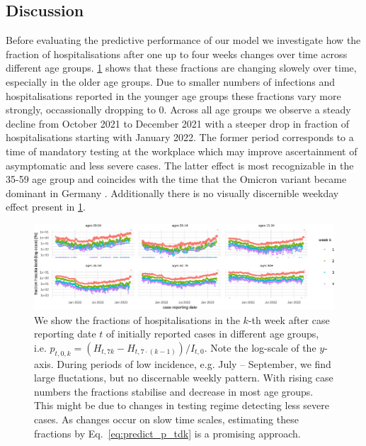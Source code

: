 \subsection{Discussion}\label{subsec:nowcasting_discussion}
Before evaluating the predictive performance of our model we investigate
how the fraction of hospitalisations after one up to four weeks changes
over time across different age groups. 
\cref{fig:hospitalisation_probabilities_over_time} shows that these
fractions are changing slowely over time, especially in the older age
groups. Due to smaller numbers of infections and hospitalisations
reported in the younger age groups these fractions vary more strongly,
occassionally dropping to \(0\). Across all age groups we observe a
steady decline from October 2021 to December 2021 with a steeper drop in
fraction of hospitalisations starting with January 2022. The former
period corresponds to a time of mandatory testing at the workplace which
may improve ascertainment of asymptomatic and less severe cases. The
latter effect is most recognizable in the 35-59 age group and coincides
with the time that the Omicron variant became dominant in Germany
\cite{RobertKoch-Institut2022Lagebericht2022-01-20}. Additionally
there is no visually discernible weekday effect present in 
\cref{fig:hospitalisation_probabilities_over_time}.

\begin{figure}

    {\centering \includegraphics[width=\textwidth]{figures_tentative/hospitalisation_probabilities_over_time-1} 

}

\caption{We show the fractions of hospitalisations in the $k$-th week after case reporting date $t$  of initially reported cases in different age groups, i.e. $p_{t,0,k} = \left(H_{t,7 k} - H_{t, 7 \cdot (k - 1)}\right) / I_{t,0} $. Note the log-scale of the $y$-axis. During periods of low incidence, e.g. July -- September, we find large fluctations, but no discernable weekly pattern. With rising case numbers the fractions stabilise and decrease in most age groups. This might be due to changes in testing regime detecting less severe cases. As changes occur on slow time scales, estimating these fractions by Eq.~\eqref{eq:predict_p_tdk} is a promising approach.}\label{fig:hospitalisation_probabilities_over_time}
\end{figure}


